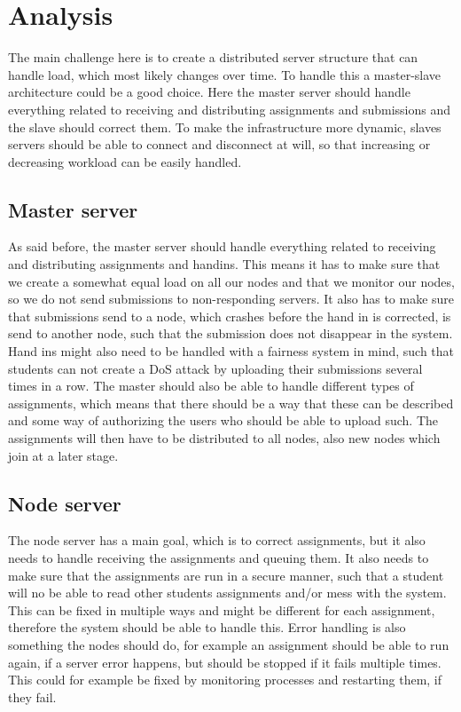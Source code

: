 \section{Analysis}
The main challenge here is to create a distributed server structure that can
handle load, which most likely changes over time. To handle this a master-slave
architecture could be a good choice. Here the master server should handle
everything related to receiving and distributing assignments and submissions and
the slave should correct them. To make the infrastructure more dynamic, slaves
servers should be able to connect and disconnect at will, so that increasing or
decreasing workload can be easily handled.

\subsection{Master server}
As said before, the master server should handle everything related to receiving
and distributing assignments and handins. This means it has to make sure that we
create a somewhat equal load on all our nodes and that we monitor our nodes, so
we do not send submissions to non-responding servers. It also has to make sure
that submissions send to a node, which crashes before the hand in is corrected,
is send to another node, such that the submission does not disappear in the
system.
Hand ins might also need to be handled with a fairness system in mind, such that
students can not create a DoS attack by uploading their submissions several
times in a row.
The master should also be able to handle different types of assignments, which
means that there should be a way that these can be described and some way of
authorizing the users who should be able to upload such.
The assignments will then have to be distributed to all nodes, also new nodes
which join at a later stage.

\subsection{Node server}
The node server has a main goal, which is to correct assignments, but it also
needs to handle receiving the assignments and queuing them. It also needs to
make sure that the assignments are run in a secure manner, such that a student
will no be able to read other students assignments and/or mess with the system.
This can be fixed in multiple ways and might be different for each assignment,
therefore the system should be able to handle this.
Error handling is also something the nodes should do, for example an assignment
should be able to run again, if a server error happens, but should be stopped if
it fails multiple times. This could for example be fixed by monitoring processes
and restarting them, if they fail.

